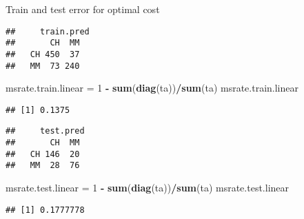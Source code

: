 \documentclass[]{article}
\newenvironment{Shaded}{\begin{snugshade}}{\end{snugshade}}
\newcommand{\DataTypeTok}[1]{\textcolor[rgb]{0.13,0.29,0.53}{#1}}
\newcommand{\DecValTok}[1]{\textcolor[rgb]{0.00,0.00,0.81}{#1}}
\newcommand{\KeywordTok}[1]{\textcolor[rgb]{0.13,0.29,0.53}{\textbf{#1}}}
\newcommand{\NormalTok}[1]{#1}
\newcommand{\OperatorTok}[1]{\textcolor[rgb]{0.81,0.36,0.00}{\textbf{#1}}}
\newcommand{\StringTok}[1]{\textcolor[rgb]{0.31,0.60,0.02}{#1}}
\begin{document}
Train and test error for optimal cost

\begin{Shaded}
\end{Shaded}

\begin{verbatim}
##     train.pred
##       CH  MM
##   CH 450  37
##   MM  73 240
\end{verbatim}

\begin{Shaded}
\begin{Highlighting}[]
\NormalTok{msrate.train.linear =}\StringTok{ }\DecValTok{1} \OperatorTok{-}\StringTok{ }\KeywordTok{sum}\NormalTok{(}\KeywordTok{diag}\NormalTok{(ta))}\OperatorTok{/}\KeywordTok{sum}\NormalTok{(ta)}
\NormalTok{msrate.train.linear}
\end{Highlighting}
\end{Shaded}

\begin{verbatim}
## [1] 0.1375
\end{verbatim}

\begin{Shaded}
\end{Shaded}

\begin{verbatim}
##     test.pred
##       CH  MM
##   CH 146  20
##   MM  28  76
\end{verbatim}

\begin{Shaded}
\begin{Highlighting}[]
\NormalTok{msrate.test.linear =}\StringTok{ }\DecValTok{1} \OperatorTok{-}\StringTok{ }\KeywordTok{sum}\NormalTok{(}\KeywordTok{diag}\NormalTok{(ta))}\OperatorTok{/}\KeywordTok{sum}\NormalTok{(ta)}
\NormalTok{msrate.test.linear}
\end{Highlighting}
\end{Shaded}

\begin{verbatim}
## [1] 0.1777778
\end{verbatim}
\end{document}
